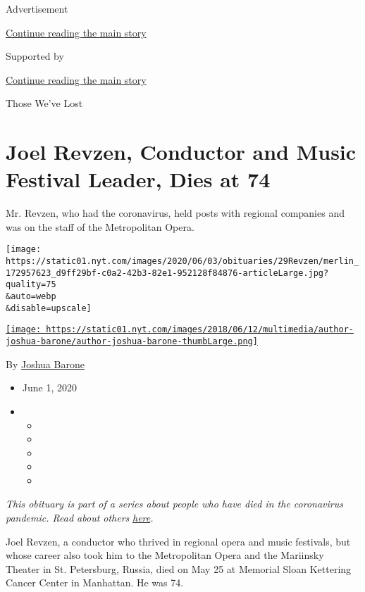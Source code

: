 Advertisement

\protect\hyperlink{after-top}{Continue reading the main story}

Supported by

\protect\hyperlink{after-sponsor}{Continue reading the main story}

Those We've Lost

\hypertarget{joel-revzen-conductor-and-music-festival-leader-dies-at-74}{%
\section{Joel Revzen, Conductor and Music Festival Leader, Dies at
74}\label{joel-revzen-conductor-and-music-festival-leader-dies-at-74}}

Mr. Revzen, who had the coronavirus, held posts with regional companies
and was on the staff of the Metropolitan Opera.

\texttt{[image: https://static01.nyt.com/images/2020/06/03/obituaries/29Revzen/merlin\_172957623\_d9ff29bf-c0a2-42b3-82e1-952128f84876-articleLarge.jpg?quality=75\\\&auto=webp\\\&disable=upscale]}

\href{https://www.nytimes.com/by/joshua-barone}{\texttt{[image: https://static01.nyt.com/images/2018/06/12/multimedia/author-joshua-barone/author-joshua-barone-thumbLarge.png]}}

By \href{https://www.nytimes.com/by/joshua-barone}{Joshua Barone}

\begin{itemize}
\item
  June 1, 2020
\item
  \begin{itemize}
  \item
  \item
  \item
  \item
  \item
  \end{itemize}
\end{itemize}

\emph{This obituary is part of a series about people who have died in
the coronavirus pandemic. Read about others}
\href{https://www.nytimes.com/interactive/2020/obituaries/people-died-coronavirus-obituaries.html}{\emph{here}}\emph{.}

Joel Revzen, a conductor who thrived in regional opera and music
festivals, but whose career also took him to the Metropolitan Opera and
the Mariinsky Theater in St. Petersburg, Russia, died on May 25 at
Memorial Sloan Kettering Cancer Center in Manhattan. He was 74.


